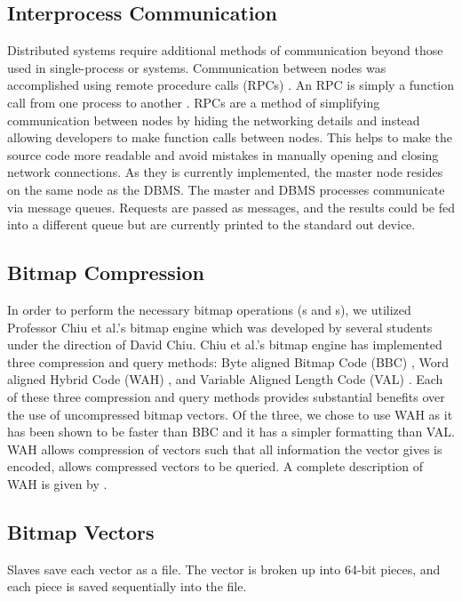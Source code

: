 \subsection{Interprocess Communication}
Distributed systems require additional methods of communication beyond those
used in single-process or systems. Communication between nodes was accomplished
using remote procedure calls (RPCs) \cite{rpcgen}. An RPC is simply a function
call from one process to another \cite{tanenbaum1994}. RPCs are a method of
simplifying communication between nodes by hiding the networking details and
instead allowing developers to make function calls between nodes. This helps to
make the source code more readable and avoid mistakes in manually opening and
closing network connections. As they is currently implemented, the master node
resides on the same node as the DBMS. The master and DBMS processes
communicate via message queues. \cite{unixSystemV} Requests are passed as
messages, and the results could be fed into a different queue but are currently
printed to the standard out device.
%
\subsection{Bitmap Compression}
In order to perform the necessary bitmap operations (s and
s), we utilized Professor Chiu et al.'s bitmap engine which was
developed by several students under the direction of David Chiu. Chiu et al.'s
bitmap engine has implemented three compression and query methods: Byte aligned
Bitmap Code (BBC) \cite{wu2001}, Word aligned Hybrid Code (WAH) \cite{wu2001},
and Variable Aligned Length Code (VAL) \cite{guzun2014}. Each of these three
compression and query methods provides substantial benefits over the use of
uncompressed bitmap vectors. Of the three, we chose to use WAH as it has been
shown to be faster than BBC and it has a simpler formatting than VAL. WAH
allows compression of vectors such that all information the vector gives is
encoded, allows compressed vectors to be queried. A complete description of WAH
is given by \cite{wu2001}.
%
\subsection{Bitmap Vectors}
Slaves save each vector as a file. The vector is broken up into 64-bit pieces, and
each piece is saved sequentially into the file.
%
